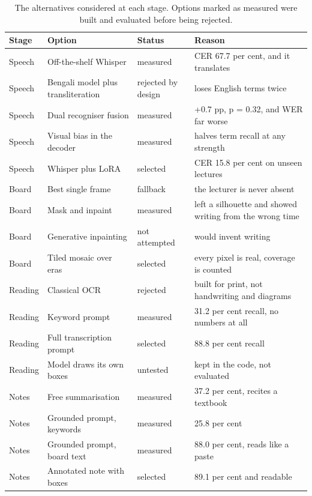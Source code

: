 \begin{table}[htbp]
\centering
\caption[The alternatives considered at each stage]{The alternatives considered at each stage. Options marked as measured were built
and evaluated before being rejected.}
\label{tab:alternatives}
\small
\begin{tabular}{p{1.8cm}p{4.4cm}p{2.0cm}p{5.4cm}}
\toprule
Stage & Option & Status & Reason \\
\midrule
Speech & Off-the-shelf Whisper & measured & CER 67.7 per cent, and it translates \\
Speech & Bengali model plus transliteration & rejected by design &
loses English terms twice \\
Speech & Dual recogniser fusion & measured & +0.7 pp, p = 0.32, and WER far worse \\
Speech & Visual bias in the decoder & measured & halves term recall at any strength \\
Speech & Whisper plus LoRA & selected & CER 15.8 per cent on unseen lectures \\
\addlinespace
Board & Best single frame & fallback & the lecturer is never absent \\
Board & Mask and inpaint & measured &
left a silhouette and showed writing from the wrong time \\
Board & Generative inpainting & not attempted & would invent writing \\
Board & Tiled mosaic over eras & selected & every pixel is real, coverage is counted \\
\addlinespace
Reading & Classical OCR & rejected & built for print, not handwriting and diagrams \\
Reading & Keyword prompt & measured & 31.2 per cent recall, no numbers at all \\
Reading & Full transcription prompt & selected & 88.8 per cent recall \\
Reading & Model draws its own boxes & untested & kept in the code, not evaluated \\
\addlinespace
Notes & Free summarisation & measured & 37.2 per cent, recites a textbook \\
Notes & Grounded prompt, keywords & measured & 25.8 per cent \\
Notes & Grounded prompt, board text & measured & 88.0 per cent, reads like a paste \\
Notes & Annotated note with boxes & selected & 89.1 per cent and readable \\
\bottomrule
\end{tabular}
\end{table}

